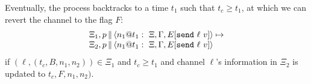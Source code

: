 \documentclass{article}
\begin{document}
\begin{itemize}
Eventually, the process backtracks to a time $t_1$ such that $t_c \geq t_1$,
at which we can revert the channel to the flag $F$:
\[\begin{array}{l}
  \Xi_1,
  \parc{p}{\proc{n_1}{\Gamma}{\Xi}{E[\send{\ell}{v}]}{t_1}} \mapsto \\
  \Xi_2,
  \parc{p}{\proc{n_1}{\Gamma}{\Xi}{E[\send{\ell}{v}]}{t_1}} 
\end{array}\]
if $(\ell,(t_c,B,n_1,n_2)) \in \Xi_1$ and $t_c \geq t_1$ and channel $\ell$'s
information in $\Xi_2$ is updated to $t_c,F,n_1,n_2)$.

\end{itemize}

\end{document}
